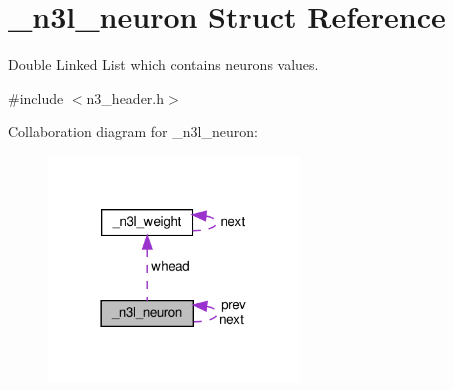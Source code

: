 \hypertarget{struct__n3l__neuron}{}\section{\+\_\+n3l\+\_\+neuron Struct Reference}
\label{struct__n3l__neuron}


Double Linked List which contains neuron\textquotesingle{}s values.  




{\ttfamily \#include $<$n3\+\_\+header.\+h$>$}



Collaboration diagram for \+\_\+n3l\+\_\+neuron\+:\nopagebreak
\begin{figure}[H]
\begin{center}
\leavevmode
\includegraphics[width=189pt]{struct__n3l__neuron__coll__graph}
\end{center}
\end{figure}
